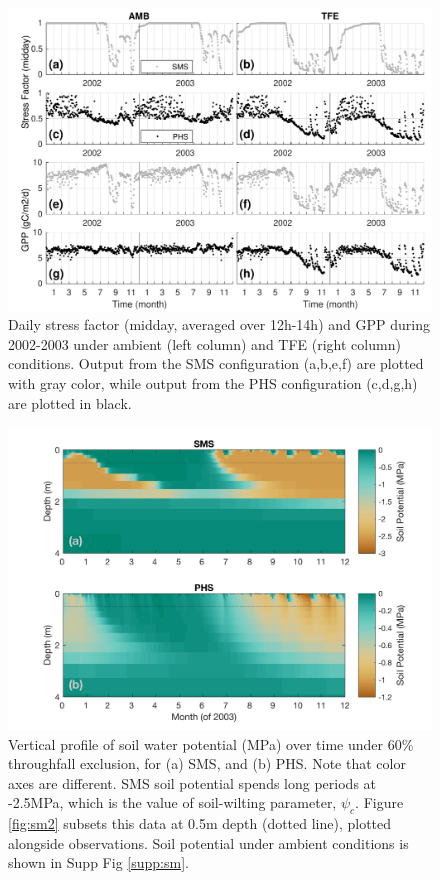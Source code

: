 \documentclass[draft,linenumbers]{agujournal}
\begin{document}
          \clearpage   
  \begin{figure}[h]
     \centering
     \includegraphics[width=30pc]{../figs3/gpp.pdf}
     \caption{Daily stress factor (midday, averaged over 12h-14h) and GPP during 2002-2003 under ambient (left column) and TFE (right column) conditions.
     Output from the SMS configuration (a,b,e,f) are plotted with gray color, while output from the PHS configuration (c,d,g,h) are plotted in black.
     }
     \label{fig:gpp}
  \end{figure} 
           


  
      \clearpage
    \begin{figure}[h]
     \centering
     \includegraphics[width=30pc]{../figs3/smp.jpg}
     \caption{Vertical profile of soil water potential (MPa) over time under 60\% throughfall exclusion, for
     (a) SMS, and 
     (b) PHS.
     Note that color axes are different.
     SMS soil potential spends long periods at -2.5MPa, which is the value of soil-wilting parameter, $\psi_c$.
     Figure \ref{fig:sm2} subsets this data at 0.5m depth (dotted line), plotted alongside observations.
     Soil potential under ambient conditions is shown in Supp Fig \ref{supp:sm}.
 }
     \label{fig:sm}
  \end{figure}
\end{document}
